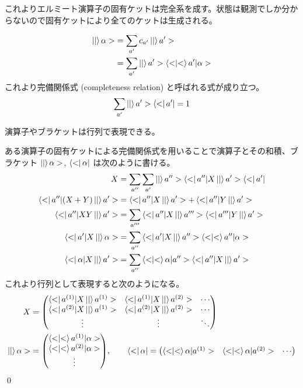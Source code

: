 \documentclass[uplatex,dvipdfmx,a4paper,11pt]{jlreq}
\makeatletter
\numberwithin{equation}{section}
\theoremstyle{definition}
\renewenvironment{proof}[1][\proofname]{\par
  \normalfont
  \topsep6\p@\@plus6\p@ \trivlist
  \item[\hskip\labelsep{\bfseries #1}\@addpunct{\bfseries}]\ignorespaces\quad\par
}{%
  \qed\endtrivlist\@endpefalse
}
\renewcommand\proofname{証明}
\makeatother
\begin{document}
これよりエルミート演算子の固有ケットは完全系を成す。状態は観測でしか分からないので固有ケットにより全てのケットは生成される。

\begin{align}
  \ket|\alpha> & = \sum_{a'}c_{a'}\ket|a'>             \\
               & = \sum_{a'}\ket|a'>\braket<a'|\alpha>
\end{align}
これより完備関係式 (completeness relation) と呼ばれる式が成り立つ。
\begin{align}
  \sum_{a'}\ket|a'>\bra<a'| = 1
\end{align}

\begin{proposition}[行列表現]
  演算子やブラケットは行列で表現できる。
\end{proposition}
\begin{proof}
  ある演算子の固有ケットによる完備関係式を用いることで演算子とその和積、ブラケット $\ket|\alpha>$, $\bra<\alpha|$ は次のように書ける。
  \begin{align}
    X                        & = \sum_{a''}\sum_{a'}\ket|a''>\bra<a''|X\ket|a'>\bra<a'| \\
    \bra<a''|(X + Y)\ket|a'> & = \bra<a''|X\ket|a'> + \bra<a''|Y\ket|a'>                \\
    \bra<a''|XY\ket|a'>      & = \sum_{a'''}\bra<a''|X\ket|a'''>\bra<a'''|Y\ket|a'>     \\
    \bra<a'|X\ket|\alpha>    & = \sum_{a''}\bra<a'|X\ket|a''>\braket<a''|\alpha>        \\
    \bra<\alpha|X\ket|a'>    & = \sum_{a''}\braket<\alpha|a''>\bra<a''|X\ket|a'>
  \end{align}
  これより行列として表現すると次のようになる。
  \begin{align}
    X                                            & = \mqty(\bra<a^{(1)}|X\ket|a^{(1)}> & \bra<a^{(1)}|X\ket|a^{(2)}> & \cdots \\
    \bra<a^{(2)}|X\ket|a^{(1)}>                  & \bra<a^{(2)}|X\ket|a^{(2)}>         & \cdots                               \\
    \vdots                                       & \vdots                              & \ddots)                              \\
    \ket|\alpha>                                 & = \mqty(\braket<a^{(1)}|\alpha>                                            \\ \braket<a^{(2)}|\alpha> \\ \vdots), \qquad
    \bra<\alpha| = \mqty(\braket<\alpha|a^{(1)}> & \braket<\alpha|a^{(2)}>             & \cdots)
  \end{align}
\end{proof}
\end{document}
